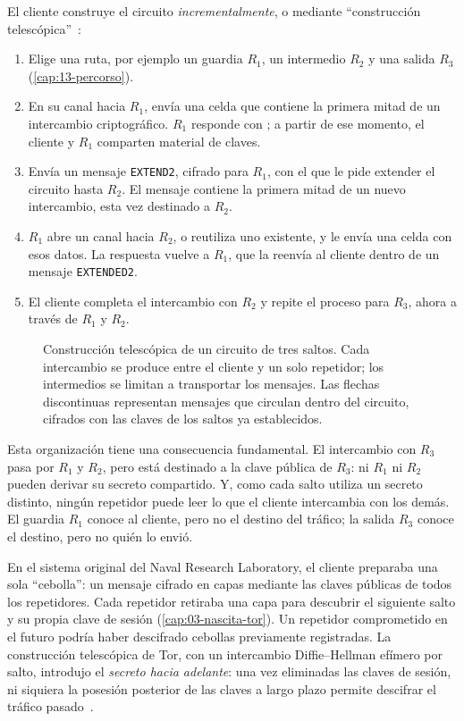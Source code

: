 El cliente construye el circuito \emph{incrementalmente}, o mediante \enquote{construcción telescópica}~\cite{dingledine2004tor}:
\begin{enumerate}
  \item Elige una ruta, por ejemplo un guardia $R_1$, un intermedio $R_2$ y una salida $R_3$ (\cref{cap:13-percorso}).
  \item En su canal hacia $R_1$, envía una celda  que contiene la primera mitad de un intercambio criptográfico. $R_1$ responde con ; a partir de ese momento, el cliente y $R_1$ comparten material de claves.
  \item Envía un mensaje \texttt{EXTEND2}, cifrado para $R_1$, con el que le pide extender el circuito hasta $R_2$. El mensaje contiene la primera mitad de un nuevo intercambio, esta vez destinado a $R_2$.
  \item $R_1$ abre un canal hacia $R_2$, o reutiliza uno existente, y le envía una celda  con esos datos. La respuesta  vuelve a $R_1$, que la reenvía al cliente dentro de un mensaje \texttt{EXTENDED2}.
  \item El cliente completa el intercambio con $R_2$ y repite el proceso para $R_3$, ahora a través de $R_1$ y $R_2$.
\end{enumerate}

\begin{figure}[htbp]
\centering

\caption{Construcción telescópica de un circuito de tres saltos. Cada intercambio se produce entre el cliente y un solo repetidor; los intermedios se limitan a transportar los mensajes. Las flechas discontinuas representan mensajes que circulan dentro del circuito, cifrados con las claves de los saltos ya establecidos.}
\label{fig:telescopio}
\end{figure}

Esta organización tiene una consecuencia fundamental. El intercambio con $R_3$ pasa por $R_1$ y $R_2$, pero está destinado a la clave pública de $R_3$: ni $R_1$ ni $R_2$ pueden derivar su secreto compartido. Y, como cada salto utiliza un secreto distinto, ningún repetidor puede leer lo que el cliente intercambia con los demás. El guardia $R_1$ conoce al cliente, pero no el destino del tráfico; la salida $R_3$ conoce el destino, pero no quién lo envió.

\begin{storia}
En el sistema original del Naval Research Laboratory, el cliente preparaba una sola \enquote{cebolla}: un mensaje cifrado en capas mediante las claves públicas de todos los repetidores. Cada repetidor retiraba una capa para descubrir el siguiente salto y su propia clave de sesión (\cref{cap:03-nascita-tor}). Un repetidor comprometido en el futuro podría haber descifrado cebollas previamente registradas. La construcción telescópica de Tor, con un intercambio Diffie--Hellman efímero por salto, introdujo el \emph{secreto hacia adelante}: una vez eliminadas las claves de sesión, ni siquiera la posesión posterior de las claves a largo plazo permite descifrar el tráfico pasado~\cite{dingledine2004tor}.
\end{storia}


